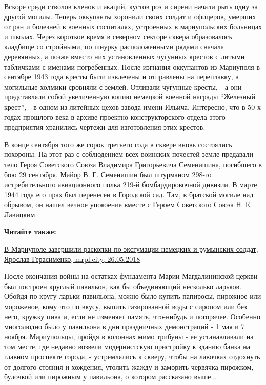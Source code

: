 Вскоре среди стволов кленов и акаций, кустов роз и сирени начали рыть одну за
другой могилы. Теперь оккупанты хоронили своих солдат и офицеров, умерших от
ран и болезней в военных госпиталях, устроенных в мариупольских больницах и
школах. Через короткое время в северном секторе сквера образовалось кладбище со
стройными, по шнурку расположенными рядами сначала деревянных, а позже вместо
них установленных чугунных крестов с литыми табличками с именами погребенных.
После изгнания оккупантов из Мариуполя в сентябре 1943 года кресты были
извлечены и отправлены на переплавку, а могильные холмики сровняли с землей.
Отливали чугунные кресты, - а они представляли собой увеличенную копию немецкой
военной награды \enquote{Железный крест}, - в одном из литейных цехов завода
имени Ильича. Интересно, что в 50-х годах прошлого века в архиве
проектно-конструкторского отдела этого предприятия хранились чертежи для
изготовления этих крестов.

В конце сентября того же сорок третьего года в сквере вновь состоялись
похороны. На этот раз с соблюдением всех воинских почестей земле предавали тело
Героя Советского Союза Владимира Григорьевича Семенишина, погибшего в бою 29
сентября. Майор В. Г. Семенишин был штурманом 298-го истребительного
авиационного полка 219-й бомбардировочной дивизии. В марте 1944 года его прах
был перенесен в Городской сад. Там, в братской могиле над обрывом, он нашел
вечное упокоение вместе с Героем Советского Союза Н. Е. Лавицким.

\textbf{Читайте также:} 

\href{https://mrpl.city/news/view/v-mariupole-zavershili-raskopki-po-e-ksgumatsii-nemetskih-i-rumynskih-soldat}{%
В Мариуполе завершили раскопки по эксгумации немецких и румынских солдат, Ярослав Герасименко, mrpl.city, 26.05.2018}


После окончания войны на остатках фундамента Марии-Магдалининской церкви был
построен круглый павильон, как бы объединяющий несколько ларьков. Обойдя по
кругу ларьки павильона, можно было купить папиросы, пирожное или мороженое,
кому что по вкусу, выпить газированной воды с сиропом или без него, кружку пива
и, если не изменяет память, что-нибудь и погорячее. Особенно многолюдно было у
павильона в дни праздничных демонстраций - 1 мая и 7 ноября. Мариупольцы,
пройдя в колоннах мимо трибуны - ее устанавливали на том месте, где недавно
возвели модернистскую пристройку к зданию банка на главном проспекте города, -
устремлялись к скверу, чтобы на лавочках отдохнуть от долгого стояния и
хождения, утолить жажду и заморить червячка пирожком, булочкой или пирожным у
павильона, о котором рассказано выше...

